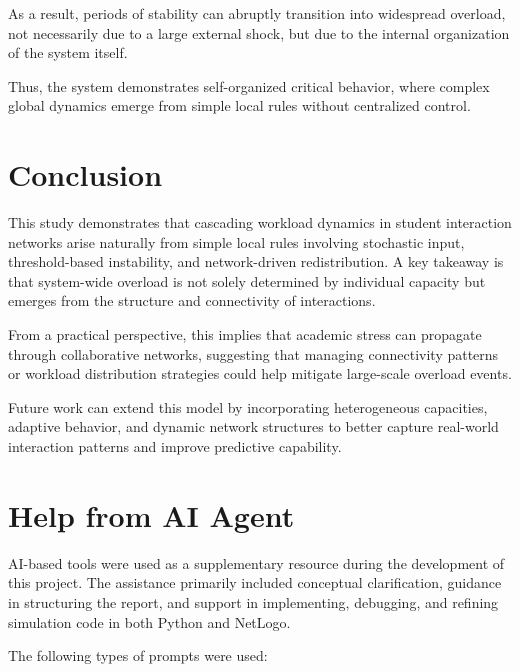 \documentclass[12pt]{article}
\begin{document}
As a result, periods of stability can abruptly transition into widespread overload, not necessarily due to a large external shock, but due to the internal organization of the system itself.

Thus, the system demonstrates self-organized critical behavior, where complex global dynamics emerge from simple local rules without centralized control.

\section{Conclusion}

This study demonstrates that cascading workload dynamics in student interaction networks arise naturally from simple local rules involving stochastic input, threshold-based instability, and network-driven redistribution. A key takeaway is that system-wide overload is not solely determined by individual capacity but emerges from the structure and connectivity of interactions.

From a practical perspective, this implies that academic stress can propagate through collaborative networks, suggesting that managing connectivity patterns or workload distribution strategies could help mitigate large-scale overload events.

Future work can extend this model by incorporating heterogeneous capacities, adaptive behavior, and dynamic network structures to better capture real-world interaction patterns and improve predictive capability.

\section{Help from AI Agent}

AI-based tools were used as a supplementary resource during the development of this project. The assistance primarily included conceptual clarification, guidance in structuring the report, and support in implementing, debugging, and refining simulation code in both Python and NetLogo.

The following types of prompts were used:
\end{document}
